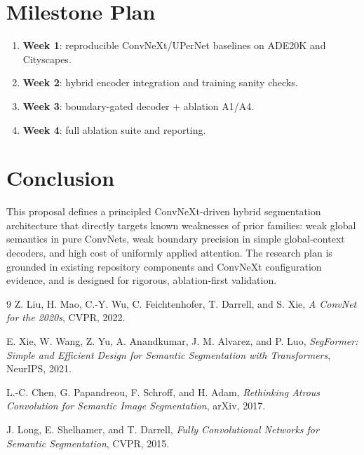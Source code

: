 \documentclass[11pt]{article}
\begin{document}
\section{Milestone Plan}
\begin{enumerate}[leftmargin=1.4em]
    \item \textbf{Week 1}: reproducible ConvNeXt/UPerNet baselines on ADE20K and Cityscapes.
    \item \textbf{Week 2}: hybrid encoder integration and training sanity checks.
    \item \textbf{Week 3}: boundary-gated decoder + ablation A1/A4.
    \item \textbf{Week 4}: full ablation suite and reporting.
\end{enumerate}

\section{Conclusion}
This proposal defines a principled ConvNeXt-driven hybrid segmentation architecture that directly targets known weaknesses of prior families: weak global semantics in pure ConvNets, weak boundary precision in simple global-context decoders, and high cost of uniformly applied attention. The research plan is grounded in existing repository components and ConvNeXt configuration evidence, and is designed for rigorous, ablation-first validation.

\begin{thebibliography}{9}
Z. Liu, H. Mao, C.-Y. Wu, C. Feichtenhofer, T. Darrell, and S. Xie,
\textit{A ConvNet for the 2020s}, CVPR, 2022.

E. Xie, W. Wang, Z. Yu, A. Anandkumar, J. M. Alvarez, and P. Luo,
\textit{SegFormer: Simple and Efficient Design for Semantic Segmentation with Transformers}, NeurIPS, 2021.

L.-C. Chen, G. Papandreou, F. Schroff, and H. Adam,
\textit{Rethinking Atrous Convolution for Semantic Image Segmentation}, arXiv, 2017.

J. Long, E. Shelhamer, and T. Darrell,
\textit{Fully Convolutional Networks for Semantic Segmentation}, CVPR, 2015.
\end{thebibliography}
\end{document}
